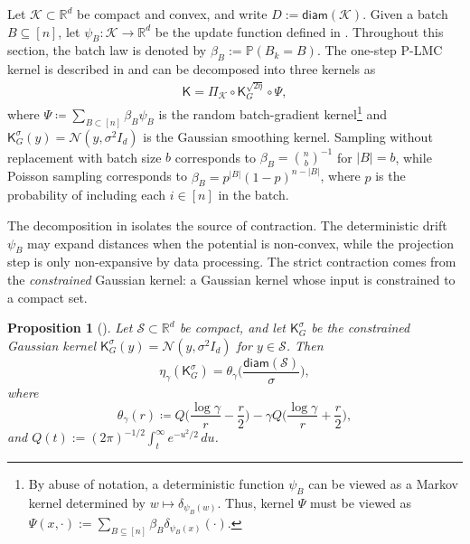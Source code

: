 \documentclass[10pt, journal]{IEEEtran}
\makeatletter
\def\eqref#1{equation~\ref{#1}}
\renewcommand{\eqref}[1]{\textup{\tagform@{\ref{#1}}}}
\newcommand{\sK}{\mathsf{K}}
\newtheorem{proposition}{Proposition}
\makeatother
\begin{document}
Let $\mathcal K\subset\mathbb R^d$ be compact and convex, and write $D:=\mathsf{diam}(\mathcal K)$. Given a batch $B\subseteq[n]$, let $\psi_B:\mathcal K\to \mathbb R^d$ be the update function defined in \eqref{eq:updatePLMC}. 
Throughout this section, the batch law is denoted by $\beta_B:=\mathbb P(B_k=B)$. 
The one-step P-LMC kernel is described in \eqref{eq:PLMC} and can be decomposed into three kernels as
\begin{align}\label{Kernel_representation}
    \mathsf{K} = \Pi_\mathcal{K} \circ \mathsf{K}_G^{\sqrt{2\eta}} \circ \Psi,
\end{align}
where $\Psi\coloneqq \sum_{B\subset [n]}\beta_B\psi_B$ is the random batch-gradient kernel\footnote{By abuse of notation, a deterministic function $\psi_B$ can be viewed as a Markov kernel determined by $w\mapsto \delta_{\psi_B(w)}$. Thus, kernel $\Psi$ must be viewed as $\Psi(x,\cdot):=\sum_{B\subseteq[n]}\beta_B\delta_{\psi_B(x)}(\cdot)$.} and $\mathsf K_G^\sigma(y)=\mathcal N(y,\sigma^2 I_d)$ is the Gaussian smoothing kernel. 
Sampling without replacement with batch size $b$ corresponds to $\beta_B=\binom nb^{-1}$ for $|B|=b$, while Poisson sampling corresponds to $\beta_B=p^{|B|}(1-p)^{n-|B|}$, where $p$ is the probability of including each $i\in [n]$ in the batch. 

The decomposition in \eqref{Kernel_representation} isolates the source of contraction. The deterministic drift $\psi_B$ may expand distances when the potential is non-convex, while the projection step is only non-expansive by data processing. The strict contraction comes from the \textit{constrained} Gaussian kernel: a Gaussian kernel whose input is constrained to a compact set.   
\begin{proposition}[\citealp{asoodeh2020contraction}]
\label{prop_eta_hockey_w_constraned}
Let $\mathcal S\subset\mathbb R^d$ be compact, and let $\mathsf K_G^\sigma$ be the constrained Gaussian kernel $\mathsf K_G^\sigma(y)=\mathcal N(y,\sigma^2I_d)$ for $y\in\mathcal S$. Then
$$\eta_\gamma(\mathsf K_G^\sigma)=\theta_\gamma\Big(\frac{\mathsf{diam}(\mathcal S)}{\sigma}\Big),$$
where $$\theta_\gamma(r)\coloneqq Q\Big(\frac{\log\gamma}{r}-\frac r2\Big)-\gamma Q\Big(\frac{\log\gamma}{r}+\frac r2\Big),$$
and $Q(t):=(2\pi)^{-1/2}\int_t^\infty e^{-u^2/2}\,du$.
\end{proposition}
\end{document}
